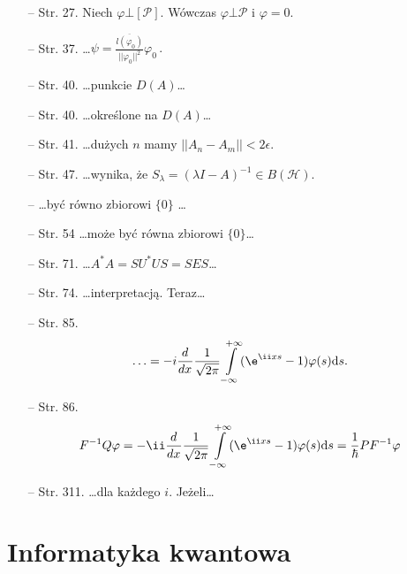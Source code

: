 \documentclass[a4paper,11pt]{article}
\begin{document}
\begin{itemize}
\item[--] Str. 27. Niech $\varphi \bot [ \mathcal{ P } ]$. Wówczas
  $\varphi \bot \mathcal{ P }$ i $\varphi = 0$.
\item[--] Str. 37.
  \ldots$\psi = \frac{ \overline{ l ( \varphi_{ 0 } ) } }{ ||
    \varphi_{ 0 } ||^{ 2 } } \varphi_{ 0 } \, .$
\item[--] Str. 40. \ldots punkcie $D( A )$\ldots
\item[--] Str. 40. \ldots określone na $D( A )$\ldots
\item[--] Str. 41. \ldots dużych $n$ mamy
  $|| A_{ n } - A_{ m } || < 2 \epsilon$.
\item[--] Str. 47. \ldots wynika, że
  $S_{ \lambda } = ( \lambda I - A )^{ -1 } \in B( \mathcal{ H } )$.
\item[--] \ldots być równo zbiorowi $\{ 0 \}$ \ldots
\item[--] Str. 54 \ldots może być równa zbiorowi $\{ 0 \}$\ldots
\item[--] Str. 71. \ldots$A^{ * } A = S U^{ * } U S = S E S$\ldots
\item[--] Str. 74. \ldots interpretacją. Teraz\ldots
\item[--] Str. 85.
  $$\ldots = -i \dd{}{}{ x } \frac{ 1 }{ \sqrt{ 2 \pi } }
  \int\limits_{ -\infty }^{ +\infty } ( \e^{ \ii x s } - 1 ) \varphi(
  s ) \de s \textrm{.}$$
\item[--] Str. 86.
  $$F^{ -1 } Q \varphi = -\ii \dd{}{}{ x } \frac{ 1 }{ \sqrt{ 2 \pi }
  } \int\limits_{ -\infty }^{ +\infty } ( \e^{ \ii x s } - 1 )
  \varphi( s ) \de s = \frac{ 1 }{ \hbar } P F^{ -1 } \varphi$$
\item[--] Str. 311. \ldots dla każdego $i$. Jeżeli\ldots
\end{itemize}





\section{Informatyka kwantowa}

\vspace{\spaceTwo}



\end{document}
